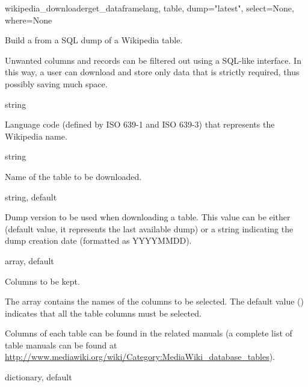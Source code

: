             \begin{functiondoc}{wikipedia\_downloader}{get\_dataframe}{lang, table, dump="latest", select=None, where=None}
                \begin{functiondescription}
                    Build a  from a SQL dump of a Wikipedia table.
                    
                    Unwanted columns and records can be filtered out using a SQL-like interface. In this way, a user can download and store only data that is strictly required, thus possibly saving much space.
                \end{functiondescription}
                
                \begin{functionparameters}
                    \item[lang] string
                    
                    Language code (defined by ISO 639-1 and ISO 639-3) that represents the Wikipedia name.
                    \item[table] string
                    
                    Name of the table to be downloaded.
                    \item[dump] string, default 
                    
                    Dump version to be used when downloading a table. This value can be either  (default value, it represents the last available dump) or a string indicating the dump creation date (formatted as YYYYMMDD).
                    
                    \item[select] array, default 
                    
                    Columns to be kept.
                    
                    The array contains the names of the columns to be selected. The default value () indicates that all the table columns must be selected.
                    
                    Columns of each table can be found in the related manuals (a complete list of table manuals can be found at \url{http://www.mediawiki.org/wiki/Category:MediaWiki_database_tables}).
                    \item[where] dictionary, default 
                    

\end{functionparameters}
\end{functiondoc}
